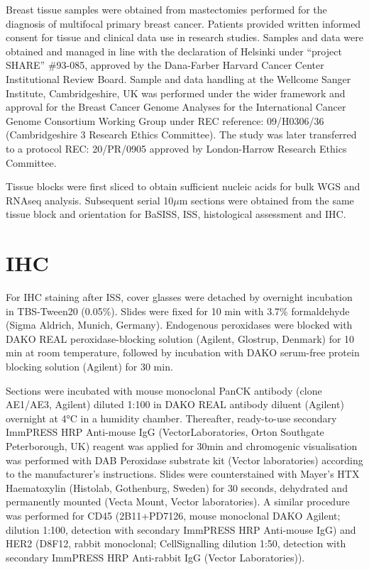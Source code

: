 Breast tissue samples were obtained from mastectomies performed for the diagnosis of multifocal primary breast cancer. Patients provided written informed consent for tissue and clinical data use in research studies.  Samples and data were obtained and managed in line with the declaration of Helsinki under “project SHARE” \#93-085, approved by the Dana-Farber Harvard Cancer Center Institutional Review Board.  Sample and data handling at the Wellcome Sanger Institute, Cambridgeshire, UK was performed under the wider framework and approval for the Breast Cancer Genome Analyses for the International Cancer Genome Consortium Working Group under REC reference: 09/H0306/36 (Cambridgeshire 3 Research Ethics Committee). The study was later transferred to a protocol REC: 20/PR/0905 approved by London-Harrow Research Ethics Committee.

Tissue blocks were first sliced to obtain sufficient nucleic acids for bulk \acf{WGS} and RNAseq analysis. Subsequent serial 10$\mu$m sections were obtained from the same tissue block and orientation for \acf{BaSISS}, \acf{ISS}, histological assessment and \acf{IHC}.

\section{\acl{IHC}}
\label{sec:protocol-suppl-ihc}

For \acl{IHC} staining after \ac{ISS}, cover glasses were detached by overnight incubation in TBS-Tween20 (0.05\%). Slides were fixed for 10 min with 3.7\% formaldehyde (Sigma Aldrich, Munich, Germany). Endogenous peroxidases were blocked with DAKO REAL peroxidase-blocking solution (Agilent, Glostrup, Denmark) for 10 min at room temperature, followed by incubation with DAKO serum-free protein blocking solution (Agilent) for 30 min.

Sections were incubated with mouse monoclonal PanCK antibody (clone AE1/AE3, Agilent) diluted 1:100 in DAKO REAL antibody diluent (Agilent) overnight at 4°C in a humidity chamber. Thereafter, ready-to-use secondary ImmPRESS HRP Anti-mouse IgG (VectorLaboratories, Orton Southgate Peterborough, UK) reagent was applied for 30min and chromogenic visualisation was performed with DAB Peroxidase substrate kit (Vector laboratories) according to the manufacturer’s instructions. Slides were counterstained with Mayer’s HTX Haematoxylin (Histolab, Gothenburg, Sweden) for 30 seconds, dehydrated and permanently mounted (Vecta Mount, Vector laboratories). A similar procedure was performed for CD45 (2B11+PD7126, mouse monoclonal DAKO Agilent; dilution 1:100, detection with secondary ImmPRESS HRP Anti-mouse IgG) and HER2 (D8F12, rabbit monoclonal; CellSignalling dilution 1:50, detection with secondary ImmPRESS HRP Anti-rabbit IgG (Vector Laboratories)). 

